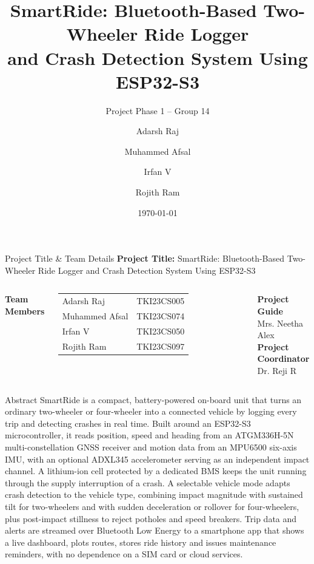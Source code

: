 \documentclass[aspectratio=169,11pt]{beamer}
\title[SmartRide]{SmartRide: Bluetooth-Based Two-Wheeler Ride Logger\\
and Crash Detection System Using ESP32-S3}
\subtitle{Project Phase 1 -- Group 14}
\author[Group 14]{Adarsh Raj \and Muhammed Afsal \and Irfan V \and Rojith Ram}
\institute[TKMIT]{Department of Computer Science and Engineering\\
TKM Institute of Technology, Kollam}
\date{\today}
\begin{document}
\begin{frame}[plain]
  \titlepage
\end{frame}

\begin{frame}{Project Title \& Team Details}
  \textbf{Project Title:} SmartRide: Bluetooth-Based Two-Wheeler Ride Logger
  and Crash Detection System Using ESP32-S3

  \vspace{1em}
  \begin{columns}[T]
      \textbf{Team Members}\\[0.4em]
      \begin{tabular}{@{}ll@{}}
        Adarsh Raj      & TKI23CS005 \\
        Muhammed Afsal  & TKI23CS074 \\
        Irfan V         & TKI23CS050 \\
        Rojith Ram      & TKI23CS097 \\
      \end{tabular}
      \textbf{Project Guide}\\[0.4em]
      Mrs. Neetha Alex\\[1em]
      \textbf{Project Coordinator}\\[0.4em]
      Dr. Reji R
  \end{columns}
\end{frame}

\begin{frame}{Abstract}
  \small\justifying
  SmartRide is a compact, battery-powered on-board unit that turns an ordinary
  two-wheeler or four-wheeler into a connected vehicle by logging every trip and
  detecting crashes in real time. Built around an ESP32-S3 microcontroller, it reads position, speed
  and heading from an ATGM336H-5N multi-constellation GNSS receiver and motion data
  from an MPU6500 six-axis IMU, with an optional ADXL345 accelerometer serving as an
  independent impact channel. A lithium-ion cell protected by a dedicated BMS keeps
  the unit running through the supply interruption of a crash. A selectable vehicle
  mode adapts crash detection to the vehicle type, combining impact magnitude with
  sustained tilt for two-wheelers and with sudden deceleration or rollover for
  four-wheelers, plus post-impact stillness to reject potholes and speed breakers.
  Trip data and
  alerts are streamed over Bluetooth Low Energy to a smartphone app that shows a
  live dashboard, plots routes, stores ride history and issues maintenance
  reminders, with no dependence on a SIM card or cloud services.
\end{frame}
\end{document}
